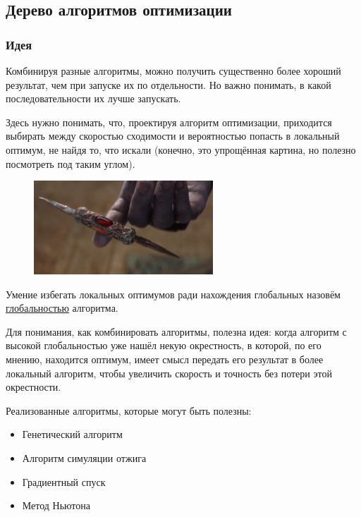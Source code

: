 \documentclass[11pt]{article}
\begin{document}
    \subsection{Дерево алгоритмов оптимизации}\label{subsec:opt-algo-tree}

    \subsubsection{Идея}\label{subsubsec:opt-tree-idea}
    Комбинируя разные алгоритмы, можно получить существенно более хороший результат, чем при запуске их по отдельности.
    Но важно понимать, в какой последовательности их лучше запускать.

    Здесь нужно понимать, что, проектируя алгоритм оптимизации, приходится выбирать между скоростью
    сходимости и вероятностью попасть в локальный оптимум, не найдя то, что искали (конечно, это упрощённая картина, но полезно посмотреть под таким углом).

    \begin{figure}[h]
        \centering
        \includegraphics[width=0.6\textwidth]{balance.jpg}
        \label{fig:perfect-balance}
    \end{figure}
    \FloatBarrier

    Умение избегать локальных оптимумов ради нахождения глобальных назовём \underline{глобальностью} алгоритма.

    Для понимания, как комбинировать алгоритмы, полезна идея: когда алгоритм с высокой глобальностью уже нашёл некую окрестность, в которой,
    по его мнению, находится оптимум, имеет смысл передать его результат в более локальный алгоритм,
    чтобы увеличить скорость и точность без потери этой окрестности.

    Реализованные алгоритмы, которые могут быть полезны:
    \begin{itemize}
        \item Генетический алгоритм
        \item Алгоритм симуляции отжига
        \item Градиентный спуск
        \item Метод Ньютона
    \end{itemize}
\end{document}
